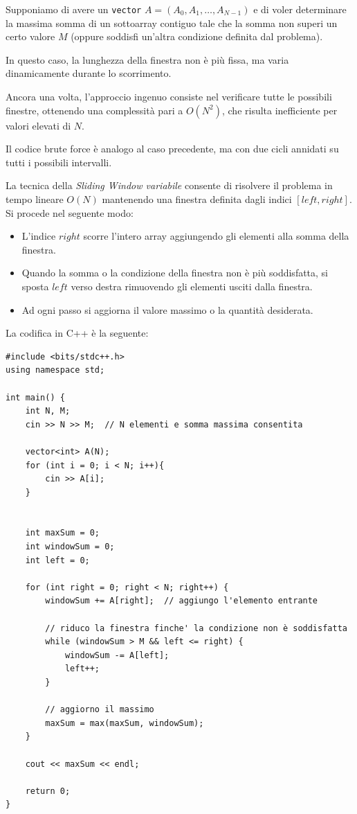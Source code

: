 \medskip

Supponiamo di avere un \texttt{vector} $A = (A_0, A_1, \dots, A_{N-1})$ e di voler determinare la massima somma di un sottoarray contiguo tale che la somma non superi un certo valore $M$ (oppure soddisfi un'altra condizione definita dal problema).  

In questo caso, la lunghezza della finestra non è più fissa, ma varia dinamicamente durante lo scorrimento.  

Ancora una volta, l'approccio ingenuo consiste nel verificare tutte le possibili finestre, ottenendo una complessità pari a $O(N^2)$, che risulta inefficiente per valori elevati di $N$.

Il codice brute force è analogo al caso precedente, ma con due cicli annidati su tutti i possibili intervalli.

\medskip

La tecnica della \textit{Sliding Window variabile} consente di risolvere il problema in tempo lineare $O(N)$ mantenendo una finestra definita dagli indici $[left, right]$.  
Si procede nel seguente modo:

\begin{itemize}
	\item L'indice $right$ scorre l'intero array aggiungendo gli elementi alla somma della finestra.
	\item Quando la somma o la condizione della finestra non è più soddisfatta, si sposta $left$ verso destra rimuovendo gli elementi usciti dalla finestra.
	\item Ad ogni passo si aggiorna il valore massimo o la quantità desiderata.
\end{itemize}


La codifica in C++ è la seguente:

\begin{lstlisting}
#include <bits/stdc++.h>
using namespace std;

int main() {
	int N, M;
	cin >> N >> M;  // N elementi e somma massima consentita
	
	vector<int> A(N);
	for (int i = 0; i < N; i++){
		cin >> A[i];
	}
	
	
	int maxSum = 0;
	int windowSum = 0;
	int left = 0;
	
	for (int right = 0; right < N; right++) {
		windowSum += A[right];  // aggiungo l'elemento entrante
		
		// riduco la finestra finche' la condizione non è soddisfatta
		while (windowSum > M && left <= right) {
			windowSum -= A[left];
			left++;
		}
		
		// aggiorno il massimo
		maxSum = max(maxSum, windowSum);
	}
	
	cout << maxSum << endl;
	
	return 0;
}
\end{lstlisting}

